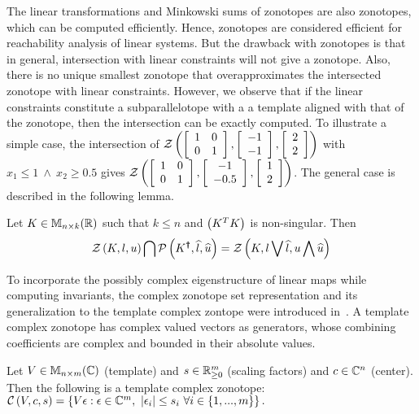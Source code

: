 The linear transformations and Minkowski sums of zonotopes are also
zonotopes, which can be computed efficiently.  Hence, zonotopes are
considered efficient for reachability analysis of linear systems.  But
the drawback with zonotopes is that in general, intersection with
linear constraints will not give a zonotope.  Also, there is no unique
smallest zonotope that overapproximates the intersected zonotope with
linear constraints.  However, we observe that if the linear
constraints constitute a subparallelotope with a a template aligned
with that of the zonotope, then the intersection can be exactly
computed.  To illustrate a simple case, the intersection of
$\mathcal{Z}\left(\left[\begin{array}{l l}1 & 0 \\ 0 &
1\end{array}\right],\left[\begin{array}{c}-1\\
-1\end{array}\right],\left[\begin{array}{c}2\\ 2\end{array}\right]\right)$ with
$x_1\leq 1~\wedge~x_2\geq 0.5$ gives $\mathcal{Z}\left(\left[\begin{array}{l l}1 &
0 \\ 0 & 1\end{array}\right],\left[\begin{array}{c}-1\\
-0.5\end{array}\right],\left[\begin{array}{c}1\\ 2\end{array}\right]\right)$.  The
general case is described in the following lemma.
%
\begin{lemma}\label{lem:motivation}
Let $K\in\mathbb{M}_{n\times k}(\mathbb{R})$ such that $k\leq n$ and $\left(K^TK\right)$ is
non-singular.  Then
\[
\mathcal{Z}\left(K,l,u\right) \bigcap \mathcal{P}\left(K^{\bm{\dagger}},\widehat{l},\widehat{u}\right)
= \mathcal{Z}\left(K,l\bigvee \widehat{l},u\bigwedge \widehat{u}\right)
\]
\end{lemma}
%
To incorporate the possibly complex eigenstructure of linear maps
while computing invariants, the complex zonotope set representation
and its generalization to the template complex zontope were introduced
in~\cite{adimoolam2016using,tcz2017}.  A template complex zonotope has
complex valued vectors as generators, whose combining coefficients are
complex and bounded in their absolute values.
%
\begin{definition}
Let $V\in\mathbb{M}_{n\times m}(\mathbb{\mathbb{C}})$ (template) and $s\in\mathbb{R}^m_{\geq 0}$ (scaling factors) and
$c\in\mathbb{C}^n$ (center).  Then the following is a template complex zonotope:
$\mathcal{C}\left(V,c,s\right) =
\left\{V\epsilon:\epsilon\in\mathbb{C}^m,~\left|\epsilon_i\right|\leq s_i~\forall
i\in\{1,...,m\}\right\}.$
\end{definition}

